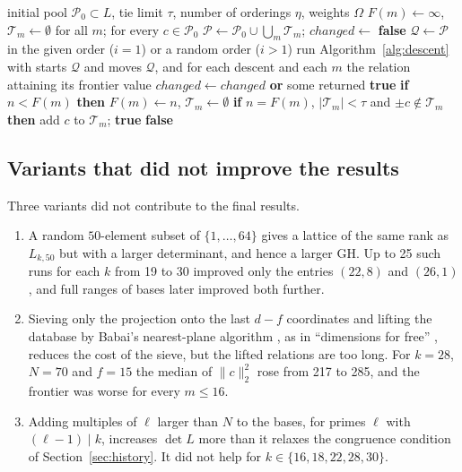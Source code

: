 \documentclass[11pt]{amsart}
\theoremstyle{definition}
\theoremstyle{remark}
\newcommand{\GH}{\mathrm{GH}}
\begin{document}
\begin{algorithm}[ht]
\caption{Combination of a pool of relations}\label{alg:combine}
\begin{algorithmic}[1]
\Require initial pool $\mathcal P_0\subset L$, tie limit $\tau$, number of orderings $\eta$, weights $\Omega$
\State $F(m)\gets\infty$, $\mathcal T_m\gets\emptyset$ for all $m$;  for every $c\in\mathcal P_0$
\Repeat
  \State $\mathcal P\gets\mathcal P_0\cup\bigcup_m\mathcal T_m$; $\mathit{changed}\gets$ \textbf{false}
    \State $\mathcal Q\gets\mathcal P$ in the given order ($i=1$) or a random order ($i>1$)
    \State run Algorithm~\ref{alg:descent} with starts $\mathcal Q$ and moves $\mathcal Q$, and for each
    descent and each $m$  the relation attaining its frontier value
    \State $\mathit{changed}\gets\mathit{changed}$ \textbf{or} some  returned \textbf{true}
  \EndFor
{}
\Statex
{} 
  \State \textbf{if} $n<F(m)$ \textbf{then} $F(m)\gets n$, $\mathcal T_m\gets\emptyset$
  \State \textbf{if} $n=F(m)$, $|\mathcal T_m|<\tau$ and $\pm c\notin\mathcal T_m$ \textbf{then} add $c$ to $\mathcal T_m$; \Return \textbf{true}
  \State \Return \textbf{false}
\EndFunction
\end{algorithmic}
\end{algorithm}

\subsection{Variants that did not improve the results}\label{sec:variants}
Three variants did not contribute to the final results.
\begin{enumerate}
\item A random $50$-element subset of $\{1,\dots,64\}$ gives a lattice of the same rank as
$L_{k,50}$ but with a larger determinant, and hence a larger $\GH$. Up to 25 such runs for
each $k$ from 19 to 30 improved only the entries $(22,8)$ and $(26,1)$, and full ranges of
bases later improved both further.
\item Sieving only the projection onto the last $d-f$ coordinates and lifting the database by
Babai's nearest-plane algorithm \cite{Babai1986}, as in ``dimensions for free'' \cite{Ducas2018}, reduces the
cost of the sieve, but the lifted relations are too long. For $k=28$, $N=70$ and $f=15$ the
median of $\|c\|_2^2$ rose from 217 to 285, and the frontier was worse for every $m\le16$.
\item Adding multiples of $\ell$ larger than $N$ to the bases, for primes $\ell$ with $(\ell-1)\mid k$,
increases $\det L$ more than it relaxes the congruence condition of
Section~\ref{sec:history}. It did not help for $k\in\{16,18,22,28,30\}$.
\end{enumerate}
\end{document}
